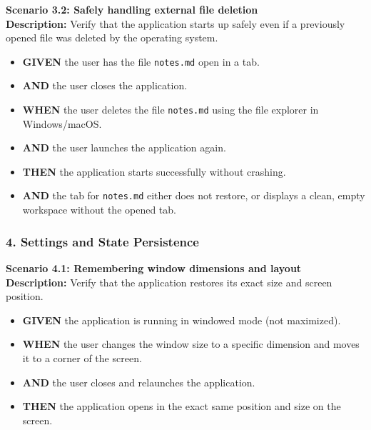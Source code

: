 \documentclass[12pt, a4paper]{article}
\begin{document}
\textbf{Scenario 3.2: Safely handling external file deletion} \\
\textbf{Description:} Verify that the application starts up safely even if a previously opened file was deleted by the operating system.
\begin{itemize}
    \item \textbf{GIVEN} the user has the file \texttt{notes.md} open in a tab.
    \item \textbf{AND} the user closes the application.
    \item \textbf{WHEN} the user deletes the file \texttt{notes.md} using the file explorer in Windows/macOS.
    \item \textbf{AND} the user launches the application again.
    \item \textbf{THEN} the application starts successfully without crashing.
    \item \textbf{AND} the tab for \texttt{notes.md} either does not restore, or displays a clean, empty workspace without the opened tab.
\end{itemize}

\subsubsection*{4. Settings and State Persistence}

\textbf{Scenario 4.1: Remembering window dimensions and layout} \\
\textbf{Description:} Verify that the application restores its exact size and screen position.
\begin{itemize}
    \item \textbf{GIVEN} the application is running in windowed mode (not maximized).
    \item \textbf{WHEN} the user changes the window size to a specific dimension and moves it to a corner of the screen.
    \item \textbf{AND} the user closes and relaunches the application.
    \item \textbf{THEN} the application opens in the exact same position and size on the screen.
\end{itemize}
\end{document}
